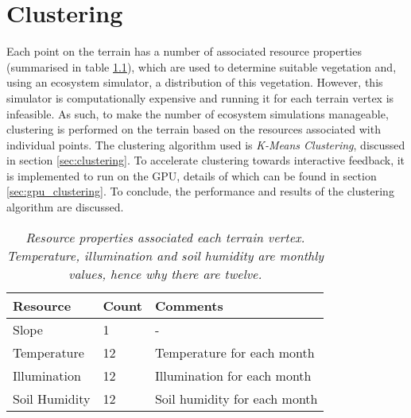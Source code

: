 \chapter{Clustering} \label{chap:clustering}

Each point on the terrain has a number of associated resource properties (summarised in table \ref{tab:point_resources}), which are used to determine suitable vegetation and, using an ecosystem simulator, a distribution of this vegetation. However, this simulator is computationally expensive and running it for each terrain vertex is infeasible. As such, to make the number of ecosystem simulations manageable, clustering is performed on the terrain based on the resources associated with individual points. The clustering algorithm used is \textit{K-Means Clustering}, discussed in section \ref{sec:clustering}. To accelerate clustering towards interactive feedback, it is implemented to run on the GPU, details of which can be found in section \ref{sec:gpu_clustering}. To conclude, the performance and results of the clustering algorithm are discussed.

\begin{table}[h]
  \centering
	    \begin{tabular}{|p{6cm}|p{3cm}|p{6cm}|}
		\hline	
  	    \textbf{Resource} & \textbf{Count} & \textbf{Comments} \\
  	    \hline	
  	    Slope & 1 & - \\
		\hline
  	    Temperature & 12 & Temperature for each month \\
		\hline
  	    Illumination & 12 & Illumination for each month \\
		\hline
  	    Soil Humidity & 12 & Soil humidity for each month \\
		\hline
		\end{tabular}
		\caption{\textit{Resource properties associated each terrain vertex. Temperature, illumination and soil humidity are monthly values, hence why there are twelve.}}
	  \label{tab:point_resources}
\end{table}



